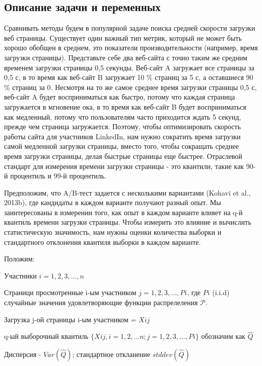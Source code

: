 \documentclass[specialist,
               substylefile = spbu_report.rtx,
               subf,href,colorlinks=true, 12pt]{disser}
\begin{document}
    \subsection{Описание задачи и переменных}
    Сравнивать методы будем в популярной задаче поиска средней скорости загрузки веб страницы. 
    Существует один важный тип метрик, который не может быть хорошо обобщен в среднем, это показатели производительности (например, время загрузки страницы). 
    Представьте себе два веб-сайта с точно таким же средним временем загрузки страницы 0,5 секунды. 
    Веб-сайт A загружает все страницы за 0,5 с, в то время как веб-сайт B загружает 10  \% страниц за 5 с, а оставшиеся 90 \% страниц за 0.
    Несмотря на то же самое среднее время загрузки страницы 0,5 с, веб-сайт A будет восприниматься как быстро, 
    потому что каждая страница загружается в мгновение ока, в то время как веб-сайт B будет восприниматься как медленный,
    потому что пользователям часто приходится ждать 5 секунд, прежде чем страница загружается.
    Поэтому, чтобы оптимизировать скорость работы сайта для участников LinkedIn, 
    нам нужно сократить время загрузки самой медленной загрузки страницы, вместо того, чтобы сокращать среднее время 
    загрузки страницы, делая быстрые страницы еще быстрее. Отраслевой стандарт для измерения времени загрузки страницы - это квантили,
    такие как 90-й процентиль и 99-й процентиль.

    Предположим, что A/B-тест задается с несколькими вариантами (Kohavi et al., 2013b), где кандидаты в каждом варианте получают разный опыт.
    Мы заинтересованы в измерении того, как опыт в каждом варианте влияет на q-й квантиль времени загрузки страницы. 
    Чтобы измерить это влияние и вычислить статистическую значимость, нам нужны оценки количества выборки и стандартного отклонения квантиля выборки в каждом варианте.
    
    Положим:

        Участники $i = 1,2,3,  ... , n$

        Страници просмотренные i-ым участником $j = 1, 2, 3, ... ,\textit{P}{i}$, где $\textit{P}{i}$ (i.i.d) случайные значения удовлетворяющие функции распрелеления $\mathcal{P}$.

        Загрузка j-ой страницы i-ым участником = $\textit{X}{ij}$   

        q-ый выборочный квантиль $\{\textit{X}{ij}, i = 1,2,...n; j = 1,2,3, ... ,  \textit{P}{i} \}$ обозначим как $\widehat{Q}$ 

        Дисперсия - $Var(\widehat{Q} )$; стандартное откланение $stddev(\widehat{Q})$
\end{document}
